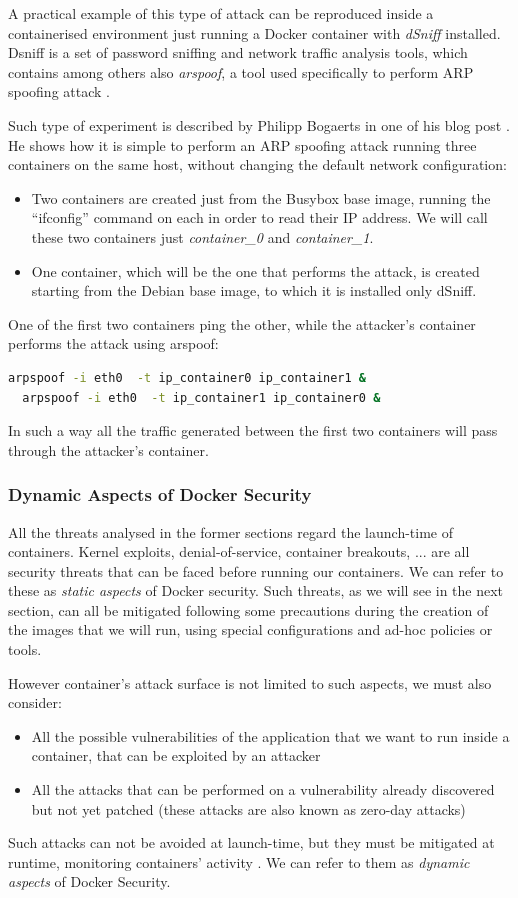 \documentclass[a4paper,12pt]{article}
\begin{document}
A practical example of this type of attack can be reproduced inside a
containerised environment just running a Docker container with \textit{dSniff}
installed. Dsniff is a set of password sniffing and network traffic analysis
tools, which contains among others also \textit{arspoof}, a tool used
specifically to perform ARP spoofing attack \cite{wiki_dsniff}. \par Such type of
experiment is described by Philipp Bogaerts in one of his blog post
 \cite{bogaerts_arpspoof}. He shows how it is simple to perform an ARP spoofing
attack running three containers on the same host, without changing the default
network configuration:
\begin{itemize}
  \item Two containers are created just from the Busybox base image, running the
  ``ifconfig'' command on each in order to read their IP address. We will call
  these two containers just \textit{container\_0} and \textit{container\_1}.
  \item One container, which will be the one that performs the attack, is created
  starting from the Debian base image, to which it is installed only dSniff. 
\end{itemize}
One of the first two containers ping the other, while the attacker's container
performs the attack using arspoof:
\begin{lstlisting}[language=bash,breaklines]
  arpspoof -i eth0  -t ip_container0 ip_container1 &
  arpspoof -i eth0  -t ip_container1 ip_container0 &
\end{lstlisting}
In such a way all the traffic generated between the first two containers will
pass through the attacker's container.

\subsubsection{Dynamic Aspects of Docker Security}

All the threats analysed in the former sections regard the launch-time of
containers. Kernel exploits, denial-of-service, container breakouts, ... are
all security threats that can be faced before running our containers. We can
refer to these as \textit{static aspects} of Docker security. Such threats, as
we will see in the next section, can all be mitigated following some precautions
during the creation of the images that we will run, using special configurations
and ad-hoc policies or tools.\par However container's attack surface is not
limited to such aspects, we must also consider:
\begin{itemize}
  \item All the possible vulnerabilities of the application that we want to run
  inside a container, that can be exploited by an attacker
  \item All the attacks that can be performed on a vulnerability already
  discovered but not yet patched (these attacks are also known as zero-day
  attacks)
\end{itemize}
Such attacks can not be avoided at launch-time, but they must be mitigated at
runtime, monitoring containers' activity . We can refer to them as
\textit{dynamic aspects} of Docker Security. 
\end{document}
